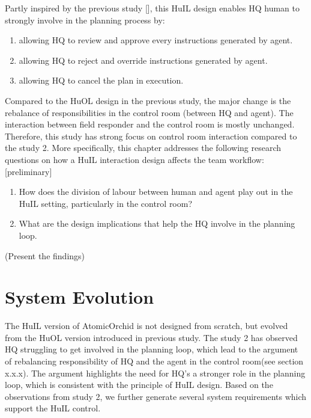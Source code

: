 Partly inspired by the previous study [], this HuIL design enables HQ human to strongly involve in the planning process by: 


\begin{enumerate}
	\item allowing HQ to review and approve every instructions generated by agent.
	\item allowing HQ to reject and override instructions generated by agent.
	\item allowing HQ to cancel the plan in execution. 
\end{enumerate}

Compared to the HuOL design in the previous study, the major change is the rebalance of responsibilities in the control room (between HQ and agent). The interaction between field responder and the control room is mostly unchanged. Therefore, this study has strong focus on control room interaction compared to the study 2. More specifically, this chapter addresses the following research questions on how a HuIL interaction design affects the team workflow: [preliminary]\\

\begin{enumerate}
 \item How does the division of labour between human and agent play out in the HuIL setting, particularly in the control room?\\
 \item What are the design implications that help the HQ involve in the planning loop. 
\end{enumerate}

(Present the findings)

\section{System Evolution}
The HuIL version of AtomicOrchid is not designed from scratch, but evolved from the HuOL version introduced in previous study. The study 2 has observed HQ struggling to get involved in the planning loop, which lead to the argument of rebalancing responsibility of HQ and the agent in the control room(see section x.x.x). The argument highlights the need for HQ's a stronger role  in the planning loop, which is consistent with the principle of HuIL design. Based on the observations from study 2, we further generate several system requirements which support the HuIL control. \\


